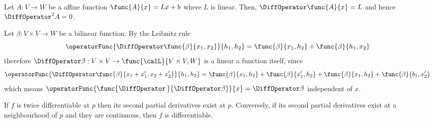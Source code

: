 \begin{example}
    Let \(A : V \to W\) be a affine function \(\func{A}{x} = Lx + b\) where \(L\) is linear. Then, \(\DiffOperator \func{A}{x} = L\) and hence \(\DiffOperator^2 A = 0\).
\end{example}

\begin{example}
    Let \(\beta : V \times V \to W\) be a bilinear function. By the Leibnitz rule
    \begin{equation*}
        \operatorFunc{\DiffOperator \func{\beta}{x_1,x_2}}{h_1,h_2} = \func{\beta}{x_1,h_2} + \func{\beta}{h_1,x_2}
    \end{equation*}
    therefore \(\DiffOperator \beta: V \times V \to \func{\calL}{V \times V, W}\) is a linear a function itself, since
    \begin{equation*}
        \operatorFunc{\DiffOperator \func{\beta}{x_1 + x'_1,x_2 + x'_2}}{h_1,h_2} = \func{\beta}{x_1,h_2} + \func{\beta}{x'_1,h_2} + \func{\beta}{x_1,h_2} + \func{\beta}{b_1,x'_2}
    \end{equation*}
    which means \(\operatorFunc{\func{\DiffOperator \,}{\DiffOperator \beta}}{x} = \DiffOperator \beta\) independent of \(x\).
\end{example}

\begin{theorem}
    If \(f\) is twice differentiable at \(p\) then its second partial derivatives exist at \(p\). Conversely, if its second partial derivatives exist at a neighbourhood of \(p\) and they are continuous, then \(f\) is differentiable.
\end{theorem}

